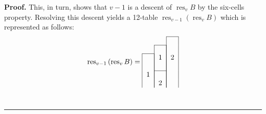 \documentclass[12pt]{article}
\theoremstyle{plain}
\theoremstyle{definition}
\newenvironment{proof}[1][Proof]{\noindent\textbf{#1.} }{\ \rule{0.5em}{0.5em}}
\begin{document}
\begin{proof}
This, in turn, shows that $v-1$ is a descent of $\operatorname*{res}%
\nolimits_{v}B$ by the six-cells property. Resolving this descent
yields a 12-table $\operatorname*{res}\nolimits_{v-1}\left(
\operatorname*{res}\nolimits_{v}B\right)  $ which is represented as follows:%
\begin{equation}
\operatorname*{res}\nolimits_{v-1}\left(  \operatorname*{res}\nolimits_{v}%
B\right)  =%
\begin{tabular}{ccc}
\cline{3-3} & & \multicolumn{1}{|c|}{} \\
\cline{2-2} & \multicolumn{1}{|c|}{} & \multicolumn{1}{|c|}{} \\
\cline{1-1} \multicolumn{1}{|c|}{} & \multicolumn{1}{|c|}{1} & \multicolumn
{1}{|c|}{2} \\
\multicolumn{1}{|c|}{} & \multicolumn{1}{|c|}{} & \multicolumn{1}{|c|}{} \\
\cline{2-2} \multicolumn{1}{|c|}{1} & \multicolumn{1}{|c|}{} & \multicolumn
{1}{|c|}{} \\
\multicolumn{1}{|c|}{} & \multicolumn{1}{|c|}{2} & \multicolumn{1}{|c|}{} \\

\end{tabular}
\end{equation}
\end{proof}
\end{document}
